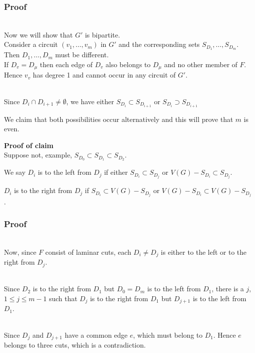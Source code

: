 \documentclass[8pt]{beamer}
\begin{document}
\begin{frame}
\frametitle{Proof}
\begin{block}\\
Now we will show that $G'$ is bipartite. \\
Consider a circuit $(v_1,\dots,v_m)$ in $G'$ and the corresponding sets $S_{D_1},\dots,S_{D_m}$.\\
Then $D_1,\dots,D_m$ must be different. \\If $D_v = D_\mu$ then each edge of $D_v$ also belongs to $D_\mu$ and no other member of $F$. Hence $v_v$ has degree 1 and cannot occur in any circuit of $G'$.
\end{block}

\begin{block}\\
Since $D_i \cap D_{i+1} \ne \emptyset$, we have either $S_{D_i}\subset S_{D_{i+1}}$ or $S_{D_i}\supset S_{D_{i+1}}$

We claim that both possibilities occur alternatively and this will prove that $m$ is even.
\end{block}

\begin{block}
\textbf{Proof of claim}\\
Suppose not, example, $S_{D_0} \subset S_{D_1}\subset S_{D_2}$. 

We say $D_i$ is to the left from $D_j$ if either $S_{D_i}\subset S_{D_j}$ or $V(G)-S_{D_i}\subset S_{D_j}$. 

$D_i$ is to the right from $D_j$ if $S_{D_i}\subset V(G)-S_{D_j}$ or $V(G)-S_{D_i}\subset V(G)-S_{D_j}$. 
\end{block}

\end{frame}

\begin{frame}
\frametitle{Proof}
\begin{block}\\
Now, since $F$ consist of laminar cuts, each $D_i\ne D_j$ is either to the left or to the right from $D_j$.
\end{block}

\begin{block}\\
Since $D_2$ is to the right from $D_1$ but $D_0 = D_m$ is to the left from $D_1$, there is a $j$, $1\le j\le m-1$ such that $D_j$ is to the right from $D_1$ but $D_{j+1}$ is to the left from $D_1$.  
\end{block}

\begin{block}\\
Since $D_j$ and $D_{j+1}$ have a common edge $e$, which must belong to $D_1$. Hence $e$ belongs to three cuts, which is a contradiction. 
\end{block}

\eofproof
\end{frame}
\end{document}
